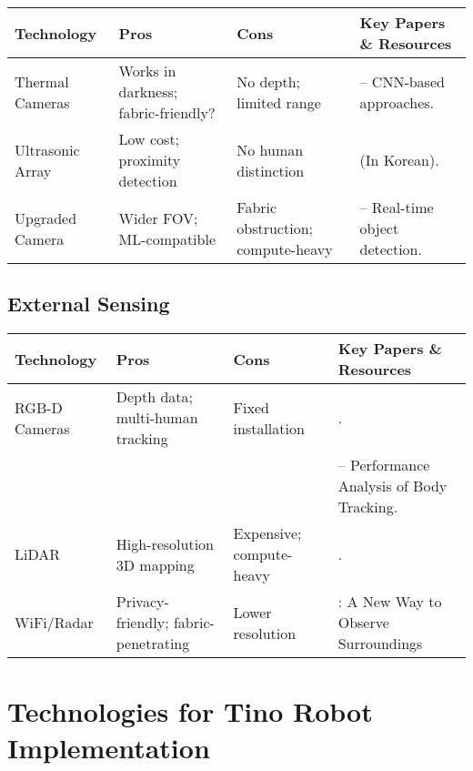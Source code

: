 \begin{table}[H]
    \centering
    \begin{tabular}{|>{\raggedright\arraybackslash}p{3cm}|>{\raggedright\arraybackslash}p{3cm}|>{\raggedright\arraybackslash}p{3cm}|>{\raggedright\arraybackslash}p{5cm}|}
        \hline
        \textbf{Technology} & \textbf{Pros} & \textbf{Cons} & \textbf{Key Papers \& Resources} \\ \hline
        Thermal Cameras & Works in darkness; fabric-friendly? & No depth; limited range & \cite{thermal2019detection} – CNN-based approaches. \\ \hline
        Ultrasonic Array & Low cost; proximity detection & No human distinction & \cite{ultrasonic2020tracking} (In Korean). \\ \hline
        Upgraded Camera & Wider FOV; ML-compatible & Fabric obstruction; compute-heavy & \cite{wang2022yolov7} – Real-time object detection. \\ \hline
    \end{tabular}
\end{table}

\subsection*{External Sensing}

\begin{table}[H]
    \centering
    \begin{tabular}{|>{\raggedright\arraybackslash}p{3cm}|>{\raggedright\arraybackslash}p{3cm}|>{\raggedright\arraybackslash}p{3cm}|>{\raggedright\arraybackslash}p{5cm}|}
        \hline
        \textbf{Technology} & \textbf{Pros} & \textbf{Cons} & \textbf{Key Papers \& Resources} \\ \hline
        RGB-D Cameras & Depth data; multi-human tracking & Fixed installation & \cite{cao2019openpose}. \\ 
         & & & \cite{azure2021kinect} – Performance Analysis of Body Tracking. \\ \hline
        LiDAR & High-resolution 3D mapping & Expensive; compute-heavy & \cite{yan2019lidar}. \\ \hline
        WiFi/Radar & Privacy-friendly; fabric-penetrating & Lower resolution & \cite{rfsensing2022}: A New Way to Observe Surroundings\\ \hline
    \end{tabular}
\end{table}


\section*{Technologies for Tino Robot Implementation}

